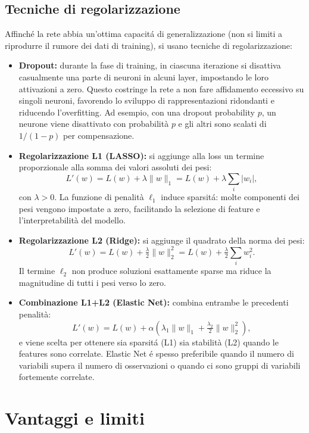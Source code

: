 \documentclass[a4paper,12pt]{report}
\begin{document}
	\subsection{Tecniche di regolarizzazione}
	Affinché la rete abbia un'ottima capacitá di generalizzazione (non si limiti a riprodurre il rumore dei dati di training), si usano tecniche di regolarizzazione:
	\begin{itemize}
		\item \textbf{Dropout:} durante la fase di training, in ciascuna iterazione si disattiva casualmente una parte di neuroni in alcuni layer, impostando le loro attivazioni a zero. Questo costringe la rete a non fare affidamento eccessivo su singoli neuroni, favorendo lo sviluppo di rappresentazioni ridondanti e riducendo l’overfitting. Ad esempio, con una dropout probability $p$, un neurone viene disattivato con probabilità $p$ e gli altri sono scalati di $1/(1-p)$ per compensazione.
		\item \textbf{Regolarizzazione L1 (LASSO):} si aggiunge alla loss un termine proporzionale alla somma dei valori assoluti dei pesi:
		\[
		L'(w)=L(w) + \lambda \|w\|_1 = L(w) + \lambda\sum_i |w_i|,
		\]
		con $\lambda>0$. La funzione di penalità \(\ell_1\) induce sparsitá: molte componenti dei pesi vengono impostate a zero, facilitando la selezione di feature e l'interpretabilità del modello.
		\item \textbf{Regolarizzazione L2 (Ridge):} si aggiunge il quadrato della norma dei pesi:
		\[
		L'(w)=L(w) + \tfrac{\lambda}{2}\|w\|_2^2 = L(w) + \tfrac{\lambda}{2}\sum_i w_i^2.
		\]
		Il termine $\ell_2$ non produce soluzioni esattamente sparse ma riduce la magnitudine di tutti i pesi verso lo zero.
		\item \textbf{Combinazione L1+L2 (Elastic Net):} combina entrambe le precedenti penalità:
		\[
		L'(w)=L(w) + \alpha\left(\lambda_1\|w\|_1 + \tfrac{\lambda_2}{2}\|w\|_2^2\right),
		\]
		e viene scelta per ottenere sia sparsitá (L1) sia stabilità (L2) quando le features sono correlate. Elastic Net é spesso preferibile quando il numero di variabili supera il numero di osservazioni o quando ci sono gruppi di variabili fortemente correlate.
	\end{itemize}
	
	\section{Vantaggi e limiti}
	
\end{document}
